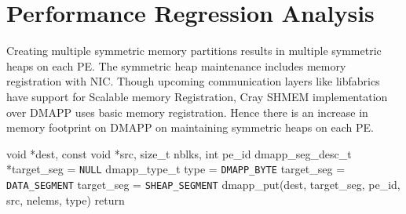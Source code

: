 \section{Performance Regression Analysis}
\label{src:regression}
Creating multiple symmetric memory partitions results in
multiple symmetric heaps on each PE. The symmetric heap maintenance
includes memory registration with NIC.%
Though upcoming communication layers like
libfabrics~\cite{libfabrics} have support for Scalable memory
Registration, Cray SHMEM implementation over DMAPP uses basic memory
registration. Hence there is an increase in memory footprint on
DMAPP on maintaining symmetric heaps on each PE.

\vspace{-20pt}
\begin{algorithm}[!h]
\begin{algorithmic}
    {void *dest, const void *src, size\_t nblks, int pe\_id}\;
        dmapp\_seg\_desc\_t *target\_seg = \texttt{NULL}\;
        dmapp\_type\_t type = \texttt{DMAPP\_BYTE}\;
         {
            target\_seg = \texttt{DATA\_SEGMENT}\;
        }  {
            target\_seg = \texttt{SHEAP\_SEGMENT}\;
        } 
        dmapp\_put(dest, target\_seg, pe\_id, src, nelems, type)\;
        return\;
    \EndProcedure
    \caption{Lookup logic with N symmetric memory partitions per PE}
    \label{algo:normal-lookup}
\end{algorithmic}
\end{algorithm}
\vspace{-20pt}

